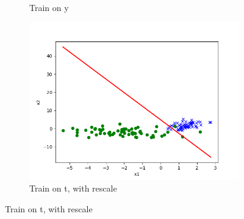 \begin{answer}
\begin{figure}[htbp]
\begin{subfigure}[b]{0.3\linewidth}
        \caption{Train on y}
    \end{subfigure}
    \begin{subfigure}[b]{0.3\linewidth}
        \centering
        \includegraphics[width=\linewidth]{pics/p02e.png}
        \caption{Train on t, with rescale}
    \end{subfigure}

\end{figure}
\end{answer}
